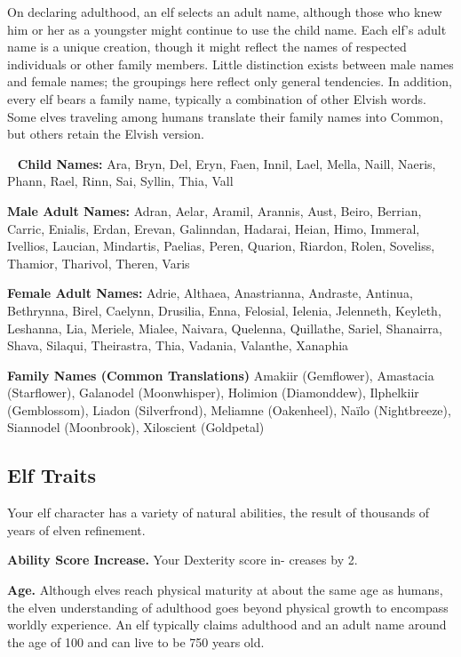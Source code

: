 On declaring adulthood, an elf selects an adult name, although those who knew him or her as a youngster might continue to use the child name. Each elf’s adult name is a unique creation, though it might reflect the names of respected individuals or other family members. Little distinction exists between male names and female names; the groupings here reflect only general tendencies. In addition, every elf bears a family name, typically a combination of other Elvish words. Some elves traveling among humans translate their family names into Common, but others retain the Elvish version.

\ \newline
\noindent \textbf{Child Names:} \hangindent=0.3cm Ara, Bryn, Del, Eryn, Faen, Innil, Lael, Mella, Naill, Naeris, Phann, Rael, Rinn, Sai, Syllin, Thia, Vall

\noindent \textbf{Male Adult Names:} \hangindent=0.3cm Adran, Aelar, Aramil, Arannis, Aust, Beiro, Berrian, Carric, Enialis, Erdan, Erevan, Galinndan, Hadarai, Heian, Himo, Immeral, Ivellios, Laucian, Mindartis, Paelias, Peren, Quarion, Riardon, Rolen, Soveliss, Thamior, Tharivol, Theren, Varis

\noindent \textbf{Female Adult Names:} \hangindent=0.3cm Adrie, Althaea, Anastrianna, Andraste, Antinua, Bethrynna, Birel, Caelynn, Drusilia, Enna, Felosial, Ielenia, Jelenneth, Keyleth, Leshanna, Lia, Meriele, Mialee, Naivara, Quelenna, Quillathe, Sariel, Shanairra, Shava, Silaqui, Theirastra, Thia, Vadania, Valanthe, Xanaphia

\noindent \textbf{Family Names (Common Translations)} \hangindent=0.3cm Amakiir (Gemflower), Amastacia (Starflower), Galanodel (Moonwhisper), Holimion (Diamonddew), Ilphelkiir (Gemblossom), Liadon (Silverfrond), Meliamne (Oakenheel), Naïlo (Nightbreeze), Siannodel (Moonbrook), Xiloscient (Goldpetal)

\subsection{Elf Traits}
Your elf character has a variety of natural abilities, the result of thousands of years of elven refinement.

\textbf{Ability Score Increase.} Your Dexterity score in- creases by 2.

\textbf{Age.} Although elves reach physical maturity at about the same age as humans, the elven understanding of adulthood goes beyond physical growth to encompass worldly experience. An elf typically claims adulthood and an adult name around the age of 100 and can live to be 750 years old.

